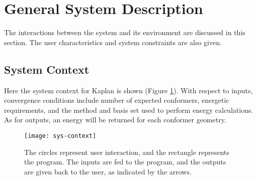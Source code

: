 \documentclass[12pt]{article}
\begin{document}
\section{General System Description} \label{3sys-desc}

The interactions between the system and its environment are discussed in this 
section. The user characteristics and system constraints are also given.

\subsection{System Context}


\noindent Here the system context for Kaplan is shown (Figure 
\ref{sys-context}). With 
respect to inputs, convergence conditions include number of expected 
conformers, energetic requirements, and the method and basis set used to 
perform energy calculations. As for outputs, an energy 
will be returned for each 
conformer geometry. 



\begin{figure}[H]
	\texttt{[image: sys-context]}
	\caption{The circles represent user interaction, and the rectangle 
	represents the program. The inputs are fed to the program, and the 
	outputs are given back to the user, as indicated by the arrows.}
	\label{sys-context}
\end{figure}
\end{document}
